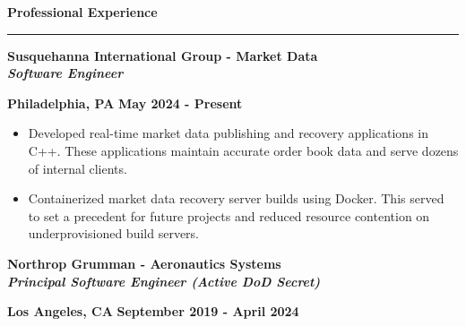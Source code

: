 \documentclass[11pt,letterpaper]{article}
\begin{document}
\medskip

\begin{large}
	\textbf{Professional Experience}
\end{large}

\smallskip \hrule \medskip

\begin{minipage}[t]{0.53\textwidth}
	\begin{flushleft}
		\textbf{Susquehanna International Group - Market Data}\\
		\textbf{\textit{Software Engineer}}\\
	\end{flushleft}
\end{minipage}
\begin{minipage}[t]{0.43\textwidth}
	\begin{flushright}
    \textbf{Philadelphia, PA} \textbar \space
		\textbf{May 2024 - Present}
	\end{flushright}
\end{minipage}

\begin{itemize}[noitemsep,topsep=0pt]
	\setlength\itemsep{0.2em}
  \item Developed real-time market data publishing and recovery applications in
        C++. These applications maintain accurate order book data and serve 
        dozens of internal clients. 
  \item Containerized market data recovery server builds using Docker. This
        served to set a precedent for future projects and reduced resource
        contention on underprovisioned build servers.
\end{itemize}

\medskip

\begin{minipage}[t]{0.53\textwidth}
	\begin{flushleft}
		\textbf{Northrop Grumman - Aeronautics Systems}\\
		\textbf{\textit{Principal Software Engineer (Active DoD Secret)}}\\
	\end{flushleft}
\end{minipage}
\begin{minipage}[t]{0.43\textwidth}
	\begin{flushright}
    \textbf{Los Angeles, CA} \textbar \space
		\textbf{September 2019 - April 2024}
	\end{flushright}
\end{minipage}
\end{document}
